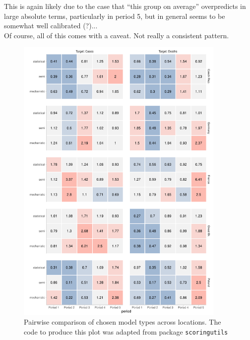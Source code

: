 This is again likely due to the case that ``this group on average'' overpredicts in large absolute terms, particularly in period 5, but in general seems to be somewhat well calibrated (?)...\\
Of course, all of this comes with a caveat. Not really a consistent pattern.
\begin{figure}
\centering
\includegraphics[width = 0.9\textwidth]{../plots/pw_comp_model_types_across_periods_and_loc.pdf}
\caption{Pairwise comparison of chosen model types across locations. The code to produce this plot was adapted from package \texttt{scoringutils}}
\label{fig:pw_comp_modeltypes_byloc}
\end{figure}
